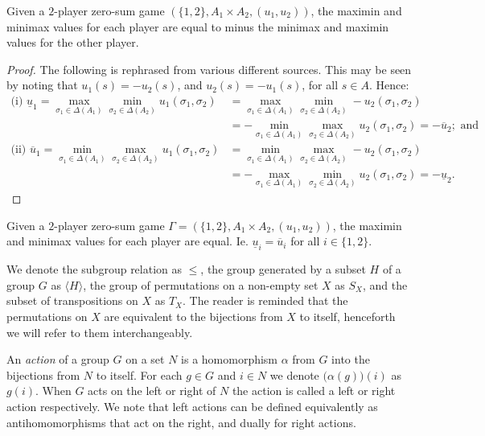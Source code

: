 	\begin{proposition}
		Given a $2$-player zero-sum game $(\{1, 2\}, A_1 \times A_2, (u_1, u_2))$, the maximin and minimax values for each player are equal to minus the minimax and maximin values for the other player.
		
		\begin{proof}
			The following is rephrased from various different sources. This may be seen by noting that $u_1(s) = -u_2(s)$, and $u_2(s) = -u_1(s)$, for all $s \in A$. Hence:
			\begin{align*}
				\text{(i) } \underline{u}_1 = \max_{\sigma_1 \in \Delta(A_1)}\min_{\sigma_2 \in \Delta(A_2)} u_1(\sigma_1, \sigma_2) &= \max_{\sigma_1 \in \Delta(A_1)}\min_{\sigma_2 \in \Delta(A_2)} -u_2(\sigma_1, \sigma_2) \\
				&= -\min_{\sigma_1 \in \Delta(A_1)}\max_{\sigma_2 \in \Delta(A_2)} u_2(\sigma_1, \sigma_2) = -\overline{u}_2; \text{ and} \\
				\text{(ii) } \overline{u}_1 = \min_{\sigma_1 \in \Delta(A_1)}\max_{\sigma_2 \in \Delta(A_2)} u_1(\sigma_1, \sigma_2) &= \min_{\sigma_1 \in \Delta(A_1)}\max_{\sigma_2 \in \Delta(A_2)} -u_2(\sigma_1, \sigma_2) \\
				&= -\max_{\sigma_1 \in \Delta(A_1)}\min_{\sigma_2 \in \Delta(A_2)} u_2(\sigma_1, \sigma_2) = -\underline{u}_2. 
			\end{align*}
		\end{proof}
	\end{proposition}
	
	\begin{proposition} \label{prop:2pzsminmax=maxmin}
		\cite{VNM} Given a $2$-player zero-sum game $\Gamma = (\{1, 2\}, A_1\times A_2, (u_1, u_2))$, the maximin and minimax values for each player are equal. Ie. $\underline{u}_i = \overline{u}_i$ for all $i \in \{1, 2\}$.
	\end{proposition}
	
	We denote the subgroup relation as $\leq$, the group generated by a subset $H$ of a group $G$ as $\langle{H}\rangle$, the group of permutations on a non-empty set $X$ as $S_X$, and the subset of transpositions on $X$ as $T_X$. The reader is reminded that the permutations on $X$ are equivalent to the bijections from $X$ to itself, henceforth we will refer to them interchangeably.
	
	An \textit{action} of a group $G$ on a set $N$ is a homomorphism $\alpha$ from $G$ into the bijections from $N$ to itself. For each $g \in G$ and $i \in N$ we denote $\bigl(\alpha(g)\bigr)(i)$ as $g(i)$. When $G$ acts on the left or right of $N$ the action is called a left or right action respectively. We note that left actions can be defined equivalently as antihomomorphisms that act on the right, and dually for right actions.
	
